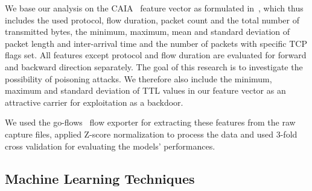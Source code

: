 \documentclass[10pt,sigconf,letterpaper,dvipsnames]{acmart}
\begin{document}
We base our analysis on the CAIA~\cite{williams_preliminary_2006} feature vector as formulated in~\cite{meghdouri_analysis_2018}, which thus includes the used protocol, flow duration, packet count and the total number of transmitted bytes, the minimum, maximum, mean and standard deviation of packet length and inter-arrival time and the number of packets with specific TCP flags set. All features except protocol and flow duration are evaluated for forward and backward direction separately. The goal of this research is to investigate the possibility of poisoning attacks. We therefore also include the minimum, maximum and standard deviation of TTL values in our feature vector as an attractive carrier for exploitation as a backdoor. %

We used the go-flows~\cite{vormayr_cn-tu/go-flows_2019} flow exporter for extracting these features from the raw capture files, applied Z-score normalization to process the data and used 3-fold cross validation for evaluating the models' performances. 


\subsection{Machine Learning Techniques}
\end{document}
